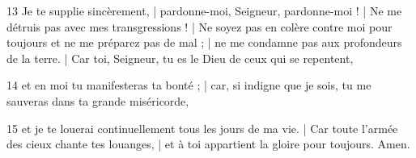 \par 13 Je te supplie sincèrement, | pardonne-moi, Seigneur, pardonne-moi ! | Ne me détruis pas avec mes transgressions ! | Ne soyez pas en colère contre moi pour toujours et ne me préparez pas de mal ; | ne me condamne pas aux profondeurs de la terre. | Car toi, Seigneur, tu es le Dieu de ceux qui se repentent,
\par 14 et en moi tu manifesteras ta bonté ; | car, si indigne que je sois, tu me sauveras dans ta grande miséricorde,
\par 15 et je te louerai continuellement tous les jours de ma vie. | Car toute l’armée des cieux chante tes louanges, | et à toi appartient la gloire pour toujours. Amen.

